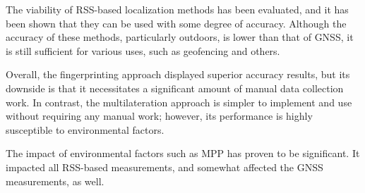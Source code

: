 The viability of \ac{RSS}-based localization methods has been evaluated, and it has been shown that they can be used with some degree of accuracy.
Although the accuracy of these methods, particularly outdoors, is lower than that of \ac{GNSS}, it is still sufficient for various uses, such as geofencing and others.

Overall, the fingerprinting approach displayed superior accuracy results, but its downside is that it necessitates a significant amount of manual data collection work.
In contrast, the multilateration approach is simpler to implement and use without requiring any manual work; however, its performance is highly susceptible to environmental factors.

The impact of environmental factors such as \ac{MPP} has proven to be significant.
It impacted all \ac{RSS}-based measurements, and somewhat affected the \ac{GNSS} measurements, as well.